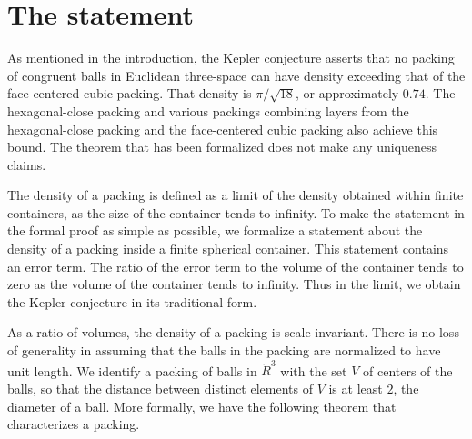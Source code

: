 \section{The statement}\label{sec:statement}

As mentioned in the introduction, the Kepler conjecture asserts that
no packing of congruent balls in Euclidean three-space can have
density exceeding that of the face-centered cubic packing.  That
density is $\pi/\sqrt{18}$, or approximately $0.74$.  The
hexagonal-close packing and various packings combining layers from the
hexagonal-close packing and the face-centered cubic packing also
achieve this bound.  The theorem that has been formalized does not
make any uniqueness claims.

The density of a packing is defined as a limit of the density obtained
within finite containers, as the size of the container tends to
infinity.  To make the statement in the formal proof as simple as
possible, we formalize a statement about the density of a packing
inside a finite spherical container.  This statement contains an error
term.  The ratio of the error term to the volume of the container
tends to zero as the volume of the container tends to infinity.  Thus
in the limit, we obtain the Kepler conjecture in its traditional form.

As a ratio of volumes, the density of a packing is scale invariant.
There is no loss of generality in assuming that the balls in the
packing are normalized to have unit length.  We identify a packing of
balls in $\ring{R}^3$ with the set $V$ of centers of the balls, so
that the distance between distinct elements of $V$ is at least $2$,
the diameter of a ball.  More formally, we have the following
theorem that characterizes a packing.

